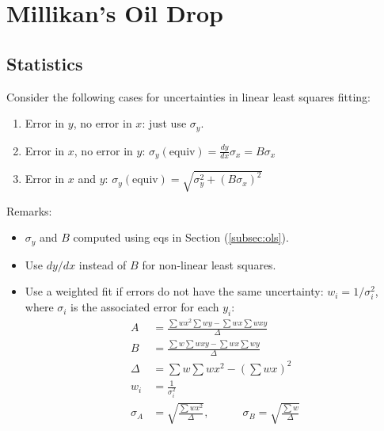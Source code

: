 \documentclass[twocolumn]{article}
\begin{document}
\section{Millikan's Oil Drop}

\subsection{Statistics}
Consider the following cases for uncertainties in linear least squares fitting:
\begin{enumerate}
    \item Error in $y$, no error in $x$: just use $\sigma_y$.
    \item Error in $x$, no error in $y$: $\sigma_y(\text{equiv}) = \frac{dy}{dx} \sigma_x = B \sigma_x$
    \item Error in $x$ and $y$: $\sigma_y(\text{equiv}) = \sqrt{\sigma_y^2 + (B \sigma_x)^2}$
\end{enumerate}

Remarks:
\begin{itemize}
    \item $\sigma_y$ and $B$ computed using eqs in Section (\ref{subsec:ols}).
    \item Use $dy/dx$ instead of $B$ for non-linear least squares.
    \item Use a weighted fit if errors do not have the same uncertainty: $w_i = 1/\sigma_i^2$, where $\sigma_i$ is the associated error for each $y_i$:
    \begin{align*}
        A &= \frac{\sum wx^2 \sum wy - \sum wx \sum wxy}{\Delta} \\
        B &= \frac{\sum w \sum wxy - \sum wx \sum wy}{\Delta} \\
        \Delta &= \sum w \sum wx^2 - (\sum wx)^2\\
        w_i &= \frac{1}{\sigma_i^2} \\
        \sigma_A &= \sqrt{\frac{\sum wx^2}{\Delta}}, \quad\quad\quad \sigma_B = \sqrt{\frac{\sum w}{\Delta}}
    \end{align*}
\end{itemize}
\end{document}
